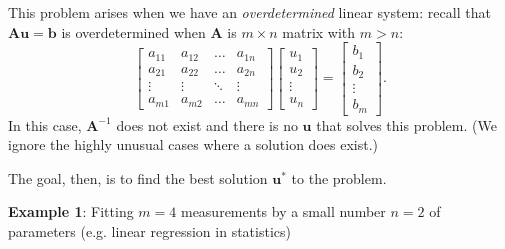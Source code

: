 This problem arises when we have an {\em overdetermined} linear system: recall that 
$\mathbf{Au} = \mathbf{b}$ is overdetermined when  $\mathbf{A}$ is  $m \times n$ matrix with $m > n$:
\[
\left[\begin{array}{cccc}
a_{11} & a_{12} & \ldots & a_{1n} \\
a_{21} & a_{22} & \ldots & a_{2n} \\
\vdots & \vdots & \ddots & \vdots \\
a_{m1} & a_{m2} & \ldots & a_{mn} 
\end{array}\right]\left[\begin{array}{c}u_1 \\ u_2 \\\vdots\\u_n\end{array}\right] =
\left[\begin{array}{c}b_1 \\ b_2 \\\vdots\\b_m\end{array}\right].
\]
In this case, $\mathbf A^{-1}$ does not exist and there is no $\mathbf u$ that solves this problem.  (We ignore the highly unusual cases where a solution does exist.)

The goal, then, is to find the  best solution $\mathbf u^*$ to the problem.  

{{\bf Example 1}: Fitting $m=4$ measurements by a small number $n=2$ of parameters (e.g. linear regression in statistics)}

